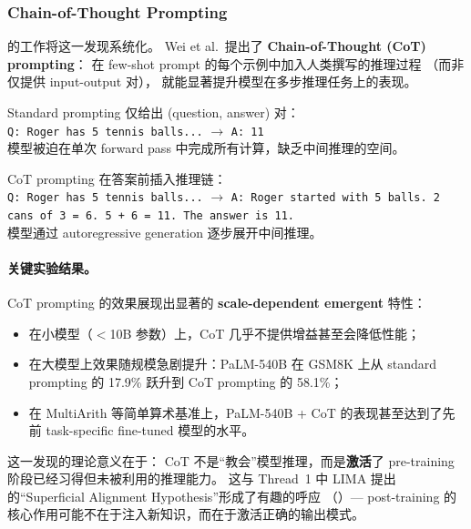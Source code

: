 \subsubsection{Chain-of-Thought Prompting}
\label{sec:t4-cot}

 的工作将这一发现系统化。
Wei et al.\ 提出了 \textbf{Chain-of-Thought (CoT) prompting}：
在 few-shot prompt 的每个示例中加入人类撰写的推理过程
（而非仅提供 input-output 对），
就能显著提升模型在多步推理任务上的表现。

\begin{problembox}
Standard prompting 仅给出 (question, answer) 对：\\
\texttt{Q: Roger has 5 tennis balls...} $\rightarrow$ \texttt{A: 11}\\
模型被迫在单次 forward pass 中完成所有计算，缺乏中间推理的空间。
\end{problembox}

\begin{solutionbox}
CoT prompting 在答案前插入推理链：\\
\texttt{Q: Roger has 5 tennis balls...} $\rightarrow$
\texttt{A: Roger started with 5 balls. 2 cans of 3 = 6. 5 + 6 = 11. The answer is 11.}\\
模型通过 autoregressive generation 逐步展开中间推理。
\end{solutionbox}

\paragraph{关键实验结果。}
CoT prompting 的效果展现出显著的 \textbf{scale-dependent emergent} 特性：
\begin{itemize}[leftmargin=2em]
  \item 在小模型（$<$10B 参数）上，CoT 几乎不提供增益甚至会降低性能；
  \item 在大模型上效果随规模急剧提升：PaLM-540B 在 GSM8K 上从 standard prompting 的 17.9\% 跃升到 CoT prompting 的 58.1\%；
  \item 在 MultiArith 等简单算术基准上，PaLM-540B + CoT 的表现甚至达到了先前 task-specific fine-tuned 模型的水平。
\end{itemize}

\noindent
这一发现的理论意义在于：
CoT 不是``教会''模型推理，而是\textbf{激活}了 pre-training 阶段已经习得但未被利用的推理能力。
这与 Thread~1 中 LIMA \cite{zhou2023lima} 提出的``Superficial Alignment Hypothesis''形成了有趣的呼应
（）---
post-training 的核心作用可能不在于注入新知识，而在于激活正确的输出模式。

